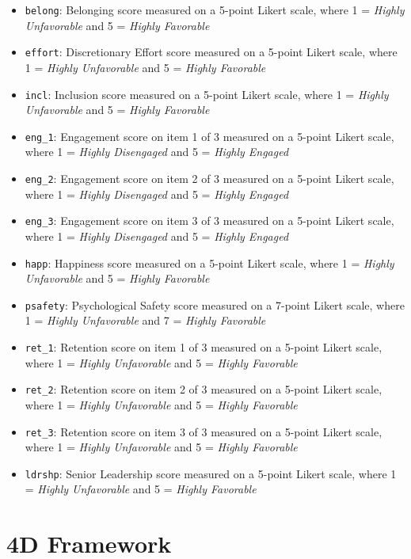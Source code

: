 \documentclass[
]{book}
\providecommand{\tightlist}{%
  \setlength{\itemsep}{0pt}\setlength{\parskip}{0pt}}
\begin{document}
\begin{itemize}
\tightlist
\item
  \texttt{belong}: Belonging score measured on a 5-point Likert scale, where 1 = \emph{Highly Unfavorable} and 5 = \emph{Highly Favorable}
\item
  \texttt{effort}: Discretionary Effort score measured on a 5-point Likert scale, where 1 = \emph{Highly Unfavorable} and 5 = \emph{Highly Favorable}
\item
  \texttt{incl}: Inclusion score measured on a 5-point Likert scale, where 1 = \emph{Highly Unfavorable} and 5 = \emph{Highly Favorable}
\item
  \texttt{eng\_1}: Engagement score on item 1 of 3 measured on a 5-point Likert scale, where 1 = \emph{Highly Disengaged} and 5 = \emph{Highly Engaged}
\item
  \texttt{eng\_2}: Engagement score on item 2 of 3 measured on a 5-point Likert scale, where 1 = \emph{Highly Disengaged} and 5 = \emph{Highly Engaged}
\item
  \texttt{eng\_3}: Engagement score on item 3 of 3 measured on a 5-point Likert scale, where 1 = \emph{Highly Disengaged} and 5 = \emph{Highly Engaged}
\item
  \texttt{happ}: Happiness score measured on a 5-point Likert scale, where 1 = \emph{Highly Unfavorable} and 5 = \emph{Highly Favorable}
\item
  \texttt{psafety}: Psychological Safety score measured on a 7-point Likert scale, where 1 = \emph{Highly Unfavorable} and 7 = \emph{Highly Favorable}
\item
  \texttt{ret\_1}: Retention score on item 1 of 3 measured on a 5-point Likert scale, where 1 = \emph{Highly Unfavorable} and 5 = \emph{Highly Favorable}
\item
  \texttt{ret\_2}: Retention score on item 2 of 3 measured on a 5-point Likert scale, where 1 = \emph{Highly Unfavorable} and 5 = \emph{Highly Favorable}
\item
  \texttt{ret\_3}: Retention score on item 3 of 3 measured on a 5-point Likert scale, where 1 = \emph{Highly Unfavorable} and 5 = \emph{Highly Favorable}
\item
  \texttt{ldrshp}: Senior Leadership score measured on a 5-point Likert scale, where 1 = \emph{Highly Unfavorable} and 5 = \emph{Highly Favorable}
\end{itemize}

\hypertarget{d-framework}{%
\section{4D Framework}\label{d-framework}}
\end{document}
